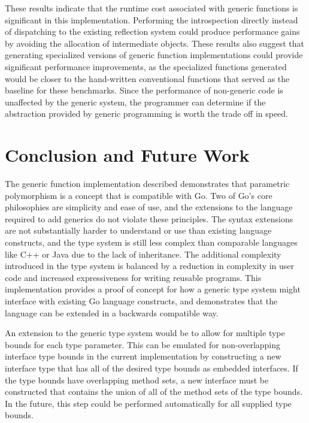 \documentclass[letterpaper,twocolumn,11pt]{article}
\begin{document}
These results indicate that the runtime cost associated with generic functions is significant in this implementation. Performing the introspection directly instead of dispatching to the existing reflection system could produce performance gains by avoiding the allocation of intermediate objects. These results also suggest that generating specialized versions of generic function implementations could provide significant performance improvements, as the specialized functions generated would be closer to the hand-written conventional functions that served as the baseline for these benchmarks. Since the performance of non-generic code is unaffected by the generic system, the programmer can determine if the abstraction provided by generic programming is worth the trade off in speed.

\section{Conclusion and Future Work} \label{conclusion}

The generic function implementation described demonstrates that parametric polymorphism is a concept that is compatible with Go. Two of Go's core philosophies are simplicity and ease of use, and the extensions to the language required to add generics do not violate these principles. The syntax extensions are not substantially harder to understand or use than existing language constructs, and the type system is still less complex than comparable languages like C++ or Java due to the lack of inheritance. The additional complexity introduced in the type system is balanced by a reduction in complexity in user code and increased expressiveness for writing reusable programs. This implementation provides a proof of concept for how a generic type system might interface with existing Go language constructs, and demonstrates that the language can be extended in a backwards compatible way.

An extension to the generic type system would be to allow for multiple type bounds for each type parameter. This can be emulated for non-overlapping interface type bounds in the current implementation by constructing a new interface type that has all of the desired type bounds as embedded interfaces. If the type bounds have overlapping method sets, a new interface must be constructed that contains the union of all of the method sets of the type bounds. In the future, this step could be performed automatically for all supplied type bounds. 
\end{document}
